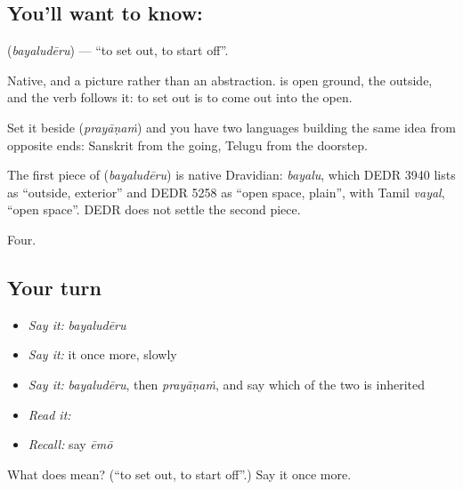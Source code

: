 \subsection*{You'll want to know: }
\textbf{} (\emph{bayaludēru}) — \textquotedblleft{}to set out, to start off\textquotedblright{}.

Native, and a picture rather than an abstraction.  is open ground, the outside, and the verb  follows it: to set out is to come out into the open.

Set it beside  (\emph{prayāṇaṁ}) and you have two languages building the same idea from opposite ends: Sanskrit from the going, Telugu from the doorstep.

\begin{cousinweb}
The first piece of \textbf{} (\emph{bayaludēru}) is native Dravidian: \emph{bayalu}, which DEDR 3940 lists as \textquotedblleft{}outside, exterior\textquotedblright{} and DEDR 5258 as \textquotedblleft{}open space, plain\textquotedblright{}, with Tamil \emph{vayal}, \textquotedblleft{}open space\textquotedblright{}. DEDR does not settle the second piece.
\end{cousinweb}

\begin{grammarlens}[title={What you've built}]
Four.
\end{grammarlens}

\subsection*{Your turn}
\begin{itemize}
\raggedright
  \item \emph{Say it:} \emph{bayaludēru}
  \item \emph{Say it:} it once more, slowly
  \item \emph{Say it:} \emph{bayaludēru}, then \emph{prayāṇaṁ}, and say which of the two is inherited
  \item \emph{Read it:} \textbf{}
  \item \emph{Recall:} say \emph{ēmō}
\end{itemize}

\begin{tcolorbox}[breakable,colback=teal!4,colframe=teal!35!black,title={Before you move on}]
What does  mean? (\textquotedblleft{}to set out, to start off\textquotedblright{}.) Say it once more.
\end{tcolorbox}
